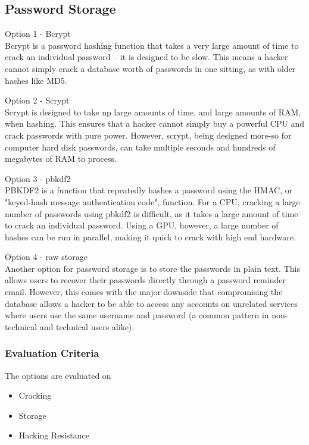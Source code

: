 \documentclass[onecolumn, draftclsnofoot,10pt, compsoc]{IEEEtran}
\begin{document}
{\newpage
\subsection{Password Storage}
\noindent Option 1 - Bcrypt \\
\noindent Bcrypt is a password hashing function that takes a very large amount of time to crack
an individual password -- it is designed to be slow. This means a hacker cannot simply crack
a database worth of passwords in one sitting, as with older hashes like MD5.

\medskip

\noindent Option 2 - Scrypt \\
\noindent Scrypt is designed to take up large amounts of time, and large amounts of RAM,
when hashing. This ensures that a hacker cannot simply buy a powerful CPU and crack passwords with
pure power. However, scrypt, being designed more-so for computer hard disk passwords, can take
multiple seconds and hundreds of megabytes of RAM to process.

\medskip

\noindent Option 3 - pbkdf2 \\
\noindent PBKDF2 is a function that repeatedly hashes a password using the HMAC, or "keyed-hash
message authentication code", function. For a CPU, cracking a large number of passwords using pbkdf2
is difficult, as it takes a large amount of time to crack an individual password. Using a GPU,
however, a large number of hashes can be run in parallel, making it quick to crack with high end hardware.

\medskip

\noindent Option 4 - raw storage \\
\noindent Another option for password storage is to store the passwords in plain text. This allows
users to recover their passwords directly through a password reminder email. However, this comes with
the major downside that compromising the database allows a hacker to be able to access any
accounts on unrelated services where users use the same username and password (a common pattern
in non-technical and technical users alike).

\medskip

\subsubsection{Evaluation Criteria}
{\noindent The options are evaluated on

\begin{itemize}
\item Cracking
\item Storage
\item Hacking Resistance
\end{itemize}

}}
\end{document}
